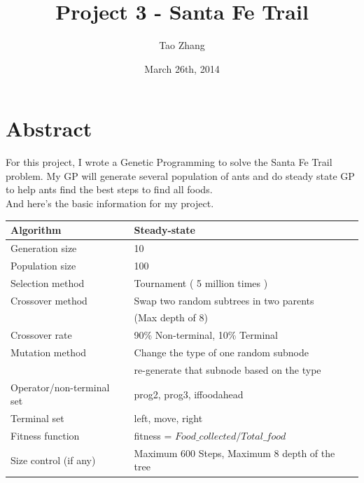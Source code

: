 \documentclass[12pt]{article} %
\title{Project 3 - Santa Fe Trail}
\author{Tao Zhang}
\date{March 26th, 2014} %
\begin{document}
\maketitle

\section{Abstract}
For this project, I wrote a Genetic Programming to solve the Santa Fe Trail problem. My GP will generate several population of ants and do steady state GP to help ants find the best steps to find all foods. \\
And here's the basic information for my project.\\

\begin{tabular}{|l|p{4in}|}
\hline
Algorithm &  Steady-state\\
\hline
Generation size & 10 \\
\hline
Population size & 100\\
\hline
Selection method & Tournament ( 5 million times )\\
\hline
Crossover method & Swap two random subtrees in two parents\\ 
& (Max depth of 8)\\
\hline
Crossover rate & 90\% Non-terminal, 10\% Terminal\\
\hline
Mutation method & Change the type of one random subnode\\
& re-generate that subnode based on the type	\\
\hline
Operator/non-terminal set & prog2, prog3, iffoodahead\\
\hline
Terminal set & left, move, right\\
\hline
Fitness function & fitness = $Food\_collected / Total\_food$ \\
\hline
Size control (if any) & Maximum 600 Steps, Maximum 8 depth of the tree\\
\hline
\end{tabular}
\end{document}
